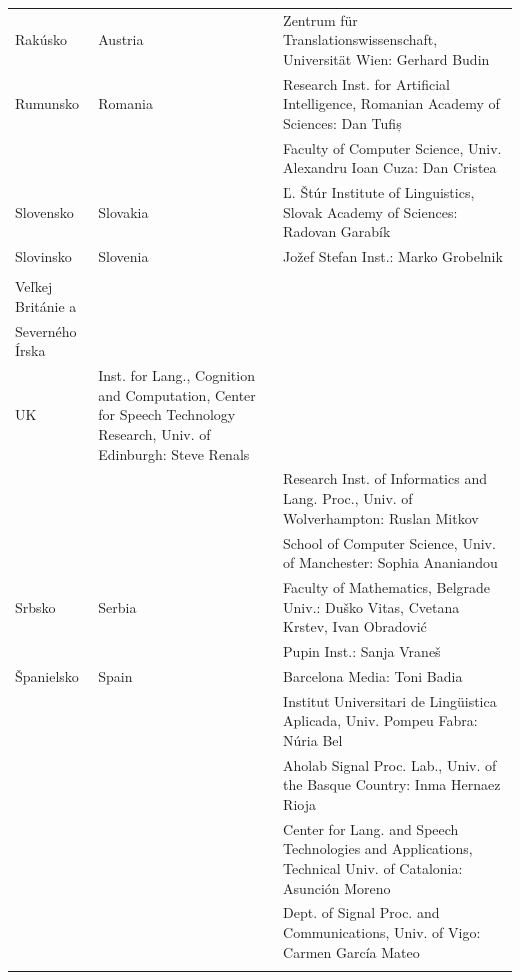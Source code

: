 \begin{longtable}{@{}llp{113mm}@{}}
  Rakúsko & \textcolor{grey1}{Austria} & Zentrum für Translationswissenschaft, Universität Wien: Gerhard Budin\\ \addlinespace 
  Rumunsko & \textcolor{grey1}{Romania} & Research Inst. for Artificial Intelligence, Romanian Academy of Sciences: Dan Tufiș \\ \addlinespace  & & Faculty of Computer Science, Univ. Alexandru Ioan Cuza: Dan Cristea \\ \addlinespace
  Slovensko & \textcolor{grey1}{Slovakia} & Ľ. Štúr Institute of Linguistics, Slovak Academy of Sciences: Radovan Garabík \\ \addlinespace 
  Slovinsko & \textcolor{grey1}{Slovenia} & Jožef Stefan Inst.: Marko Grobelnik \\ \addlinespace 
      \begin{minipage}[t]{0.2\columnwidth}%
      Spojené kráľovstvo \\
      Veľkej Británie a \\
      Severného Írska 
      \end{minipage}
            & \begin{minipage}[t]{0.15\columnwidth}%
                \hfill \\
                \textcolor{grey1}{UK} 
              \end{minipage}
            & Inst. for Lang., Cognition and Computation, Center for Speech Technology Research, Univ. of Edinburgh: Steve Renals \\ \addlinespace   & & Research Inst. of Informatics and Lang. Proc., Univ. of Wolverhampton: Ruslan Mitkov \\ \addlinespace   & & School of Computer Science, Univ. of Manchester: Sophia Ananiandou  \\ \addlinespace 
  Srbsko & \textcolor{grey1}{Serbia} & Faculty of Mathematics, Belgrade Univ.: Duško Vitas, Cvetana Krstev, Ivan Obradović \\ \addlinespace  & & Pupin Inst.: Sanja Vraneš \\ \addlinespace  
  Španielsko & \textcolor{grey1}{Spain} & Barcelona Media: Toni Badia \\ \addlinespace   & & Institut Universitari de Lingüistica Aplicada, Univ. Pompeu Fabra: Núria Bel \\ \addlinespace   & & Aholab Signal Proc. Lab., Univ. of the Basque Country: Inma Hernaez Rioja \\ \addlinespace   & & Center for Lang. and Speech Technologies and Applications, Technical Univ. of Catalonia: Asunción Moreno \\ \addlinespace   & & Dept. of Signal Proc. and Communications, Univ. of Vigo: Carmen García Mateo \\ \addlinespace 

\end{longtable}
